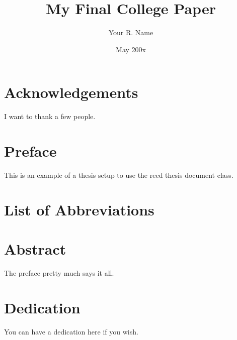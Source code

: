 \documentclass[12pt,twoside]{reedthesis}
\title{My Final College Paper}
\author{Your R. Name}
\date{May 200x}
\theoremstyle{definition}
\begin{document}
  \maketitle
  \frontmatter %
  \pagestyle{empty} %

    \chapter*{Acknowledgements}
	I want to thank a few people.

    \chapter*{Preface}
	This is an example of a thesis setup to use the reed thesis document class.
	
	

    \chapter*{List of Abbreviations}

	

    \tableofcontents
    \listoftables
    \listoffigures

    \chapter*{Abstract}
	The preface pretty much says it all.
	
	\chapter*{Dedication}
	You can have a dedication here if you wish.

  \mainmatter %
  \pagestyle{fancyplain} %

\end{document}
